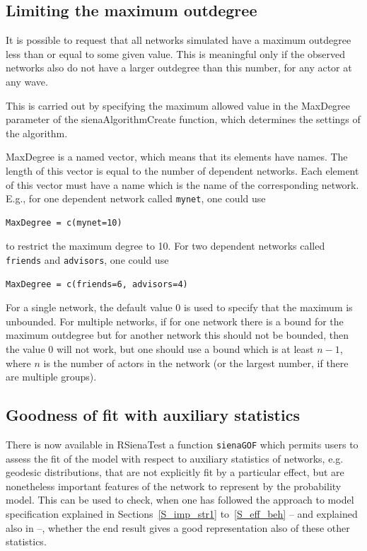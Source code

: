 \documentclass[a4paper,fleqn,11pt]{article}
\newcommand{\+}{\, + \,}
\begin{document}
\subsection{Limiting the maximum outdegree}
\label{S_maxdegree}

It is possible to request that all networks simulated have a
maximum outdegree less than or equal to some given value.
This is meaningful only if the observed networks also do
not have a larger outdegree than this number, for any actor at any wave.

This is carried out by specifying the maximum allowed value
in the \textsf{MaxDegree} parameter of the \textsf{sienaAlgorithmCreate}
function, which determines the settings of the algorithm.

\textsf{MaxDegree} is a named vector, which means that its elements
have names. The length of this vector
is equal to the number of dependent networks.
Each element of this vector must have a name
which is the name of the corresponding network.
E.g., for one dependent network called \texttt{mynet}, one could use
\begin{verbatim}
MaxDegree = c(mynet=10)
\end{verbatim}
to restrict the maximum degree to 10.
For two dependent networks called \texttt{friends} and \texttt{advisors},
one could use
\begin{verbatim}
MaxDegree = c(friends=6, advisors=4)
\end{verbatim}

For a single network, the default value 0 is used
to specify that the maximum is unbounded.
For multiple networks, if for one network
there is a bound for the maximum outdegree
 but for another network this should not be bounded, then
 the value 0 will not work,
 but one should use a bound which is at least $n-1$,
where $n$ is the number of actors in the network (or the largest number,
if there are multiple groups).

\subsection{Goodness of fit with auxiliary statistics}
\label{S_gof}

There is now available in RSienaTest a function \verb!sienaGOF!
which permits users to assess the fit of the model with respect to
auxiliary statistics of networks,
e.g. geodesic distributions,
that are not explicitly fit by a particular effect,
but are nonetheless important features of the network to represent by the
probability model.
This can be used to check, when one has followed the approach to
model specification explained in Sections~\ref{S_imp_str1}
to~\ref{S_eff_beh} -- and explained also in \citet{SnijdersEA10b} --,
whether the end result gives a good representation
also of these other statistics.
\end{document}
